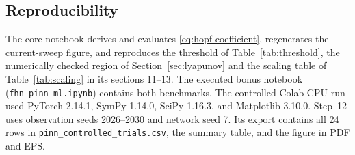 \documentclass[11pt,a4paper]{article}
\begin{document}
\subsection*{Reproducibility}

The core notebook derives and evaluates \eqref{eq:hopf-coefficient}, regenerates the current-sweep figure, and reproduces the threshold of Table~\ref{tab:threshold}, the numerically checked region of Section~\ref{sec:lyapunov} and the scaling table of Table~\ref{tab:scaling} in its sections 11--13. The executed bonus notebook (\texttt{fhn\_pinn\_ml.ipynb}) contains both benchmarks. The controlled Colab CPU run used PyTorch 2.14.1, SymPy 1.14.0, SciPy 1.16.3, and Matplotlib 3.10.0. Step~12 uses observation seeds 2026--2030 and network seed 7. Its export contains all 24 rows in \texttt{pinn\_controlled\_trials.csv}, the summary table, and the figure in PDF and EPS.

\begingroup
\footnotesize
\setlength{\parskip}{0pt}
\setlength{\bibsep}{0.1em}


\endgroup
\end{document}
